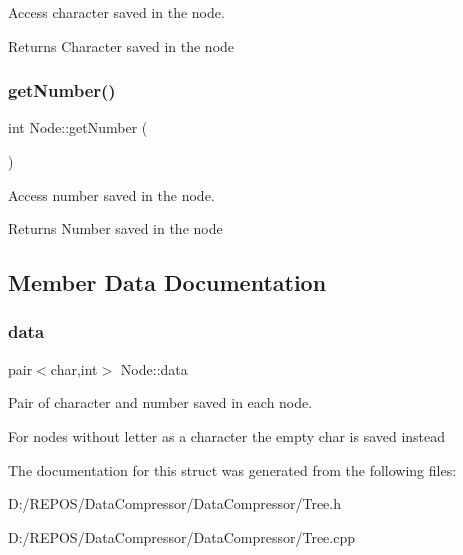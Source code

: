 Access character saved in the node. 

\begin{DoxyReturn}{Returns}
Character saved in the node 
\end{DoxyReturn}
\mbox{\label{struct_node_a7fd57dccb57f67113c2894d0d52da537}} 
\subsubsection{\texorpdfstring{getNumber()}{getNumber()}}
{\footnotesize\ttfamily int Node\+::get\+Number (\begin{DoxyParamCaption}{ }\end{DoxyParamCaption})}



Access number saved in the node. 

\begin{DoxyReturn}{Returns}
Number saved in the node 
\end{DoxyReturn}


\subsection{Member Data Documentation}
\mbox{\label{struct_node_aaa1c70b22c4bea8ee8d05294b244c9c5}} 
\subsubsection{\texorpdfstring{data}{data}}
{\footnotesize\ttfamily pair$<$char,int$>$ Node\+::data}



Pair of character and number saved in each node. 

For nodes without letter as a character the empty char is saved instead 

The documentation for this struct was generated from the following files\+:\begin{DoxyCompactItemize}
\item 
D\+:/\+R\+E\+P\+O\+S/\+Data\+Compressor/\+Data\+Compressor/Tree.\+h\item 
D\+:/\+R\+E\+P\+O\+S/\+Data\+Compressor/\+Data\+Compressor/Tree.\+cpp\end{DoxyCompactItemize}
